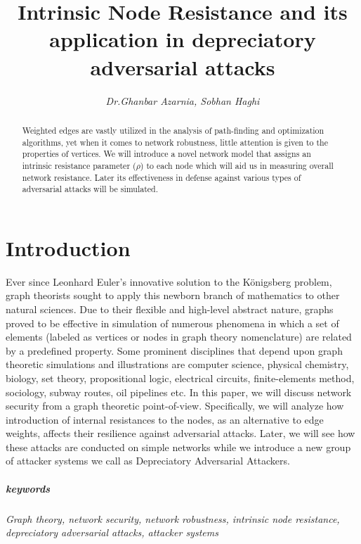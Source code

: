 \documentclass{article}
\begin{document}
	\title{\textbf{Intrinsic Node Resistance and its application in depreciatory adversarial attacks}}
	\author{\emph{Dr.Ghanbar Azarnia, Sobhan Haghi}}
	\maketitle
	
	\begin{abstract}
		Weighted edges are vastly utilized in the analysis of path-finding and optimization algorithms, yet when it comes to network robustness, little attention is given to the properties of vertices. We will introduce a novel network model that assigns an intrinsic resistance parameter ($\rho$) to each node which will aid us in measuring overall network resistance. Later its effectiveness in defense against various types of adversarial attacks will be simulated.
	\end{abstract}
	
	\section{Introduction}
	Ever since Leonhard Euler's innovative solution to the K\"{o}nigsberg problem, graph theorists sought to apply this newborn branch of mathematics to other natural sciences. Due to their flexible and high-level abstract nature, graphs proved to be effective in simulation of numerous phenomena in which a set of elements (labeled as vertices or nodes in graph theory nomenclature) are related by a predefined property\cite{tucker2012applied}. Some prominent disciplines that depend upon graph theoretic simulations and illustrations are computer science, physical chemistry\cite{klein1993m}, biology\cite{mason2007graph}, set theory, propositional logic, electrical circuits, finite-elements method, sociology, subway routes, oil pipelines etc. In this paper, we will discuss network security from a graph theoretic point-of-view. Specifically, we will analyze how introduction of internal resistances to the nodes, as an alternative to edge weights, affects their resilience against adversarial attacks. Later, we will see how these attacks are conducted on simple networks while we introduce a new group of attacker systems we call as Depreciatory Adversarial Attackers.
	\subparagraph{keywords}\textit{Graph theory, network security, network robustness, intrinsic node resistance, depreciatory adversarial attacks, attacker systems}
	
\end{document}
